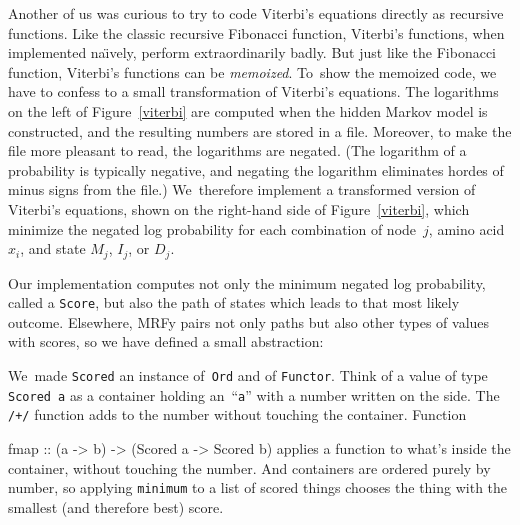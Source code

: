 \documentclass[preprint,nonatbib,blockstyle,nocopyrightspace,times]{sigplanconf}
\newcommand\naive{na\"\i ve}
\newcommand\figref[1]{Figure~\ref{#1}}
\newenvironment{smallverbatim}{\par\small\verbatim}{\endverbatim}
\newcommand\smallverbatiminput[1]{{\par\unskip\small}}
\begin{document}
Another of us was curious to try to code Viterbi's equations
directly as recursive functions.
Like the classic recursive Fibonacci function, Viterbi's functions,
when implemented \naive ly,
perform extraordinarily badly.
But just like the Fibonacci function, Viterbi's functions can be
\emph{memoized}.
To~show the memoized code, we have to confess to a small
transformation of Viterbi's equations.
The logarithms on the left of \figref{viterbi} are computed when the
hidden Markov model is constructed, and the resulting numbers are
stored in a file.
Moreover, to make the file more pleasant to read, the logarithms are
negated.
(The logarithm of a probability is typically negative, and negating
the logarithm eliminates hordes of minus signs from the file.)
We~therefore implement a transformed version of Viterbi's equations,
shown on the right-hand side of \figref{viterbi}, which minimize the
negated log probability for each combination of node~$j$, amino
acid~$x_i$, and state $M_j$, $I_j$, or $D_j$.

Our implementation computes not only the minimum
negated log probability, called a \texttt{Score},
but also the path of states which leads to that most likely outcome. 
Elsewhere, MRFy pairs not only paths but also other types of values
with scores, so we have defined a small abstraction:
\smallverbatiminput{vscore}
We~made \texttt{Scored} an instance of~\texttt{Ord} and of
\texttt{Functor}.
Think of a value of type \texttt{Scored~a} as a container holding
 an~``\texttt a'' with a number written on the side.
The \texttt{/+/} function adds to the number without touching the
 container.
Function 
\begin{smallverbatim}
fmap :: (a -> b) -> (Scored a -> Scored b)
\end{smallverbatim}
applies a function to what's inside the container, without touching
the number.
And containers are ordered purely by number, so applying
\texttt{minimum} to a list of scored things chooses the thing with the
smallest (and therefore best) score.
\end{document}
